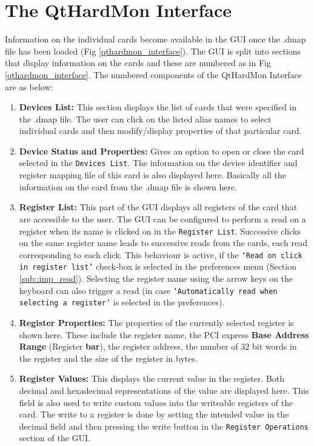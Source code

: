 \section{The QtHardMon Interface}
Information on the individual cards become available in the GUI once the .dmap file has been loaded (Fig \ref{qthardmon_interface}). The GUI is split into sections that display information on the cards and these are numbered as in Fig \ref{qthardmon_interface}. The numbered components of the QtHardMon Interface are as below:
\begin{enumerate}
\item \textbf{Devices List:} This section displays the list of cards that were specified in the .dmap file. The user can click on the listed alias names to select individual cards and then modify/display properties of that particular card. 

\item \textbf{Device Status and Properties:} Gives an option to open or close the card selected in the \texttt{Devices List}. The information on the device identifier and register mapping file of this card is also displayed here. Basically all the information on the card from the .dmap file is shown here. 

\item \textbf{Register List:} This part of the GUI displays all registers of the card that are accessible to the user. The GUI can be configured to perform a read on a register when its name is clicked on in the \texttt{Register List}. Successive clicks on the same register name leads to successive reads from the cards, each read corresponding to each click. This behaviour is active, if the \texttt{`Read on click in register list'} check-box is selected in the preferences menu (Section \ref{sub::imp_read}). Selecting the register name using the arrow keys on the keyboard can also trigger a read (in case \texttt{`Automatically read when selecting a register'} is selected in the preferences).

\item \textbf{Register Properties:} The properties of the currently selected register is shown here. These include the register name, the PCI express \textbf{Base Address Range} (Register \textbf{bar}), the register address, the number of 32 bit words in the register and the size of the register in bytes.

\item \textbf{Register Values:} This displays the current value in the register. Both decimal and hexadecimal representations of the value are displayed here. This field is also used to write custom values into the writeable registers of the card. The write to a register is done by setting the intended value in the decimal field and then pressing the write button in the \texttt{Register Operations} section of the GUI.


\end{enumerate}
